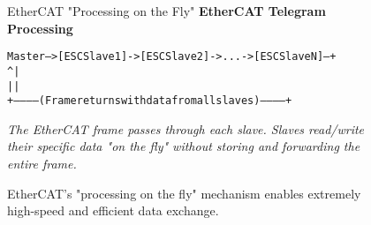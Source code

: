 \begin{itemize}
\begin{figure}[h!]
    \centering
    \begin{infobox}{EtherCAT "Processing on the Fly"}
        \textbf{EtherCAT Telegram Processing}
        \vspace{0.3cm}
        {\footnotesize
        \begin{alltt}
Master ---> [ESC Slave 1] -> [ESC Slave 2] -> ... -> [ESC Slave N] --+
  ^                                                                 |
  |                                                                 |
  +------------(Frame returns with data from all slaves)------------+
        \end{alltt}
        }
        \vspace{0.2cm}
        \textit{The EtherCAT frame passes through each slave. Slaves read/write their specific data "on the fly" without storing and forwarding the entire frame.}
    \end{infobox}
    \vspace{0.3cm}
    \caption{EtherCAT's "processing on the fly" mechanism enables extremely high-speed and efficient data exchange.}
    \label{fig:ethercat_processing}
\end{figure}
\end{itemize}

